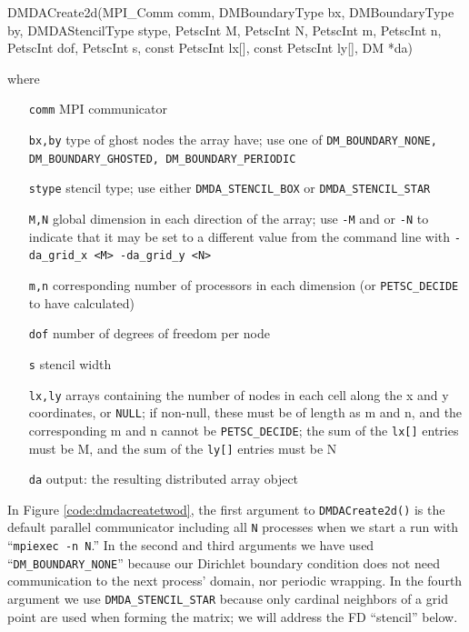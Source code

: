 \begin{code}
DMDACreate2d(MPI_Comm comm, DMBoundaryType bx, DMBoundaryType by,
  DMDAStencilType stype, PetscInt M, PetscInt N, PetscInt m, PetscInt n,
  PetscInt dof, PetscInt s, const PetscInt lx[], const PetscInt ly[],
  DM *da)
\end{code}
where
\small
\begin{itemize}[align=left]
\item[\texttt{comm}]   MPI communicator \\
\item[\texttt{bx,by}]  type of ghost nodes the array have; use one of \texttt{DM\_BOUNDARY\_NONE, DM\_BOUNDARY\_GHOSTED, DM\_BOUNDARY\_PERIODIC} \\
\item[\texttt{stype}] stencil type; use either \texttt{DMDA\_STENCIL\_BOX} or \texttt{DMDA\_STENCIL\_STAR} \\
\item[\texttt{M,N}]	   global dimension in each direction of the array; use \texttt{-M} and or \texttt{-N} to indicate that it may be set to a different value from the command line with \texttt{-da\_grid\_x <M> -da\_grid\_y <N>} \\
\item[\texttt{m,n}]   corresponding number of processors in each dimension (or \texttt{PETSC\_DECIDE} to have calculated) \\
\item[\texttt{dof}]     number of degrees of freedom per node \\
\item[\texttt{s}]       stencil width \\
\item[\texttt{lx,ly}]  arrays containing the number of nodes in each cell along the x and y coordinates, or \texttt{NULL}; if non-null, these must be of length as m and n, and the corresponding m and n cannot be \texttt{PETSC\_DECIDE}; the sum of the \texttt{lx[]} entries must be M, and the sum of the \texttt{ly[]} entries must be N \\
\item[\texttt{da}]      output: the resulting distributed array object 
\end{itemize}
\normalsize
\noindent\hrulefill
\medskip

\noindent In Figure \ref{code:dmdacreatetwod}, the first argument to \texttt{DMDACreate2d()} is the default parallel \MPI communicator including all \texttt{N} processes when we start a run with ``\texttt{mpiexec -n N}.''  In the second and third arguments we have used ``\texttt{DM\_BOUNDARY\_NONE}'' because our Dirichlet boundary condition does not need communication to the next process' domain, nor periodic wrapping.  In the fourth argument we use \texttt{DMDA\_STENCIL\_STAR} because only cardinal neighbors of a grid point are used when forming the matrix; we will address the FD ``stencil'' below.


